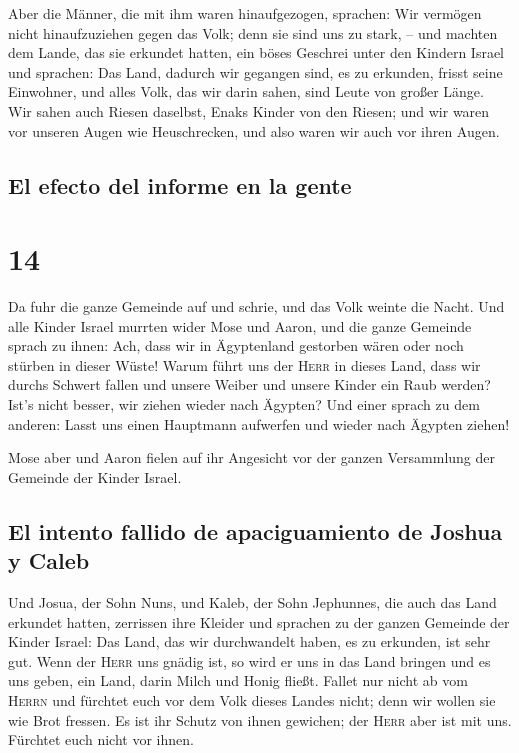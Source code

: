  Aber die Männer, die mit ihm waren hinaufgezogen,
sprachen: Wir vermögen nicht hinaufzuziehen gegen das Volk; denn sie
sind uns zu stark, --  und machten dem Lande, das sie
erkundet hatten, ein böses Geschrei unter den Kindern Israel und
sprachen: Das Land, dadurch wir gegangen sind, es zu erkunden, frisst
seine Einwohner, und alles Volk, das wir darin sahen, sind Leute von
großer Länge.  Wir sahen auch Riesen daselbst, Enaks
Kinder von den Riesen; und wir waren vor unseren Augen wie Heuschrecken,
und also waren wir auch vor ihren Augen.

\hypertarget{el-efecto-del-informe-en-la-gente}{%
\subsection{El efecto del informe en la
gente}\label{el-efecto-del-informe-en-la-gente}}

\hypertarget{section-13}{%
\section{14}\label{section-13}}

 Da fuhr die ganze Gemeinde auf und schrie, und das Volk
weinte die Nacht.  Und alle Kinder Israel murrten wider
Mose und Aaron, und die ganze Gemeinde sprach zu ihnen: Ach, dass wir in
Ägyptenland gestorben wären oder noch stürben in dieser Wüste!
 Warum führt uns der \textsc{Herr} in dieses Land, dass
wir durchs Schwert fallen und unsere Weiber und unsere Kinder ein Raub
werden? Ist's nicht besser, wir ziehen wieder nach Ägypten?
 Und einer sprach zu dem anderen: Lasst uns einen
Hauptmann aufwerfen und wieder nach Ägypten ziehen!

 Mose aber und Aaron fielen auf ihr Angesicht vor der
ganzen Versammlung der Gemeinde der Kinder Israel.

\hypertarget{el-intento-fallido-de-apaciguamiento-de-joshua-y-caleb}{%
\subsection{El intento fallido de apaciguamiento de Joshua y
Caleb}\label{el-intento-fallido-de-apaciguamiento-de-joshua-y-caleb}}

 Und Josua, der Sohn Nuns, und Kaleb, der Sohn Jephunnes,
die auch das Land erkundet hatten, zerrissen ihre Kleider 
und sprachen zu der ganzen Gemeinde der Kinder Israel: Das Land, das wir
durchwandelt haben, es zu erkunden, ist sehr gut.  Wenn
der \textsc{Herr} uns gnädig ist, so wird er uns in das Land bringen und
es uns geben, ein Land, darin Milch und Honig fließt. 
Fallet nur nicht ab vom \textsc{Herrn} und fürchtet euch vor dem Volk
dieses Landes nicht; denn wir wollen sie wie Brot fressen. Es ist ihr
Schutz von ihnen gewichen; der \textsc{Herr} aber ist mit uns. Fürchtet
euch nicht vor ihnen.

